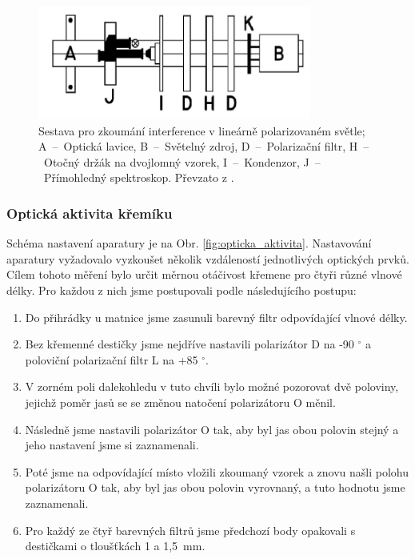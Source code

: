 \documentclass[english]{article}
\begin{document}
			\begin{figure}[h!]
			\centering
			\includegraphics[width=9cm]{att/interference.pdf}
			\caption{Sestava pro zkoumání interference v lineárně polarizovaném světle; A~--~Optická lavice, B~--~Světelný zdroj, D~--~Polarizační filtr, H~--~Otočný držák na dvojlomný vzorek, I~--~Kondenzor, J~--~Přímohledný spektroskop. Převzato z \cite{bib:zadani}.}
			\label{fig:interference}
			\end{figure}
			
		\subsubsection{Optická aktivita křemíku}
			Schéma nastavení aparatury je na Obr. \ref{fig:opticka_aktivita}. Nastavování aparatury vyžadovalo vyzkoušet několik vzdáleností jednotlivých optických prvků. Cílem tohoto měření bylo určit měrnou otáčivost křemene pro čtyři různé vlnové délky. Pro každou z nich jsme postupovali podle následujícího postupu:
			\begin{enumerate}
				\item Do přihrádky u matnice jsme zasunuli barevný filtr odpovídající vlnové délky.
				\item Bez křemenné destičky jsme nejdříve nastavili polarizátor D na -90 $^\circ$ a poloviční polarizační filtr L na +85 $^\circ$.
				\item V zorném poli dalekohledu v tuto chvíli bylo možné pozorovat dvě poloviny, jejichž poměr jasů se se změnou natočení polarizátoru O měnil.
				\item Následně jsme nastavili polarizátor O tak, aby byl jas obou polovin stejný a jeho nastavení jsme si zaznamenali.
				\item Poté jsme na odpovídající místo vložili zkoumaný vzorek a znovu našli polohu polarizátoru O tak, aby byl jas obou polovin vyrovnaný, a tuto hodnotu jsme zaznamenali. 
				\item Pro každý ze čtyř barevných filtrů jsme předchozí body opakovali s destičkami o tloušťkách 1 a 1,5~mm.
			\end{enumerate}
			
\end{document}
